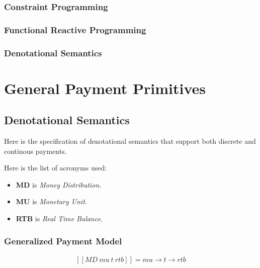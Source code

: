 \documentclass[a4paper,10pt]{report}
\begin{document}
\subsection{Constraint Programming}

\subsection{Functional Reactive Programming}

\subsection{Denotational Semantics}

\chapter{General Payment Primitives}

\section{Denotational Semantics}

Here is the specification of denotational semantics that support both discrete and continous payments.

Here is the list of acronyms used:

\begin{itemize}
    \item \textbf{MD} is \textit{Money Distribution}.
    \item \textbf{MU} is \textit{Monetary Unit}.
    \item \textbf{RTB} is \textit{Real Time Balance}.
\end{itemize}

\subsection{Generalized Payment Model}

\begin{equation}\label{sem_transfer}
    \begin{split}
        [\![MD\ mu\ t\ rtb]\!] = mu \rightarrow t \rightarrow rtb
    \end{split}
\end{equation}
\end{document}
